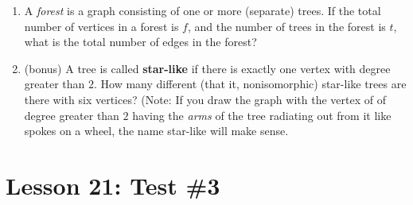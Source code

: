 \documentclass[11pt]{amsart}
\begin{document}
\begin{enumerate}
\item A {\it forest} is a graph consisting of one or more (separate) trees. If the total number of vertices in a forest is $f$, and the number of trees in the forest is $t$, what is the total number of edges in the forest?\\[5pt] 


\item (bonus) A tree is called {\bf star{-}like} if there is exactly one vertex with degree greater than $2$. How many different (that it, nonisomorphic) star{-}like trees are there with six vertices? (Note: If you draw the graph with the vertex of of degree greater than $2$ having the {\it arms} of the tree radiating out from it like spokes on a wheel, the name star{-}like will make sense.\\[5pt]
\end{enumerate}


\section{Lesson 21: Test \#3}
\end{document}
